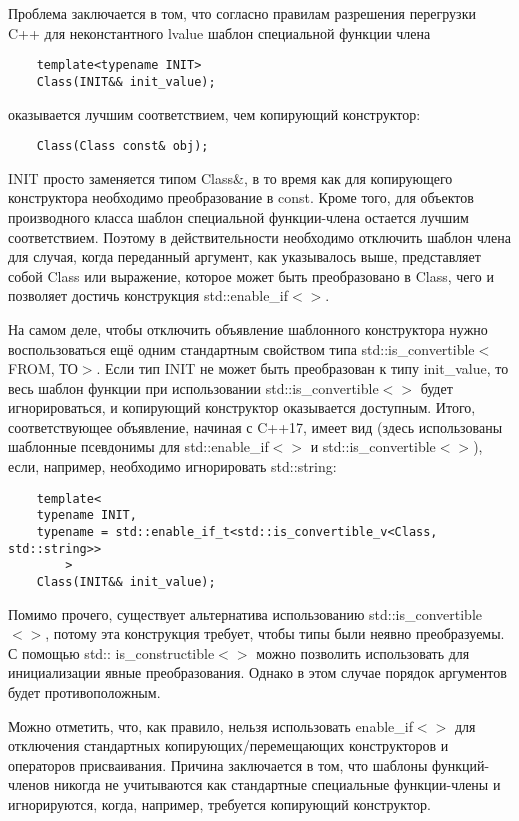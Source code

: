 \documentclass[a4paper,12pt]{article}	%
\begin{document}
	Проблема заключается в том, что согласно правилам разрешения перегрузки C++ для неконстантного lvalue шаблон специальной функции члена
	
	\begin{lstlisting}
	template<typename INIT>
	Class(INIT&& init_value);
	\end{lstlisting}
оказывается лучшим соответствием, чем копирующий конструктор:

	\begin{lstlisting}
	Class(Class const& obj);
	\end{lstlisting}
	
	INIT просто заменяется типом Class\&, в то время как для копирующего конструктора необходимо преобразование в const. Кроме того, для объектов производного класса шаблон специальной функции-члена остается лучшим соответствием. Поэтому в действительности необходимо отключить шаблон члена для случая, когда переданный аргумент, как указывалось выше, представляет собой Class или выражение, которое может быть преобразовано в Class, чего и позволяет достичь конструкция std::enable\_if$<>$.
	
	На самом деле, чтобы отключить объявление шаблонного конструктора нужно воспользоваться ещё одним стандартным свойством типа std::is\_convertible$<$FROM, ТО$>$. Если тип INIT не может быть преобразован к типу init\_value, то весь шаблон функции при использовании std::is\_convertible$<>$ будет игнорироваться, и копирующий конструктор оказывается доступным. Итого, соответствующее объявление, начиная с C++17, имеет вид (здесь использованы шаблонные псевдонимы для std::enable\_if$<>$ и std::is\_convertible$<>$), если, например, необходимо игнорировать std::string:

	\begin{lstlisting}
	template<
	typename INIT,
	typename = std::enable_if_t<std::is_convertible_v<Class, std::string>>
		>
	Class(INIT&& init_value);
	\end{lstlisting}

	Помимо прочего, существует альтернатива использованию std::is\_convertible$<>$, потому эта конструкция требует, чтобы типы были неявно преобразуемы. С помощью std:: is\_constructible$<>$ можно позволить использовать для инициализации явные преобразования. Однако в этом случае порядок аргументов будет противоположным.
	
	Можно отметить, что, как правило, нельзя использовать enable\_if$<>$ для отключения стандартных копирующих/перемещающих конструкторов и операторов присваивания. Причина заключается в том, что шаблоны функций-членов никогда не учитываются как стандартные специальные функции-члены и игнорируются, когда, например, требуется копирующий конструктор.
	
\end{document}
